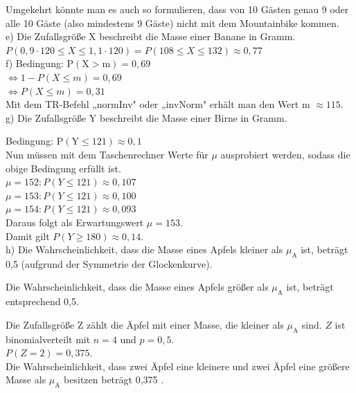 \documentclass[10pt]{article}
\begin{document}
Umgekehrt könnte man es auch so formulieren, dass von 10 Gästen genau 9 oder alle 10 Gäste (also mindestens 9 Gäste) nicht mit dem Mountainbike kommen.\\
e) Die Zufallsgröße X beschreibt die Masse einer Banane in Gramm.\\
$P(0,9 \cdot 120 \leq X \leq 1,1 \cdot 120)=P(108 \leq X \leq 132) \approx 0,77$\\
f) Bedingung: $\mathrm{P}(\mathrm{X}>\mathrm{m})=0,69$\\
$\Leftrightarrow 1-P(X \leq m)=0,69$\\
$\Leftrightarrow P(X \leq m)=0,31$\\
Mit dem TR-Befehl „normInv" oder „invNorm" erhält man den Wert m $\approx 115$.\\
g) Die Zufallsgröße Y beschreibt die Masse einer Birne in Gramm.

Bedingung: $\mathrm{P}(\mathrm{Y} \leq 121) \approx 0,1$\\
Nun müssen mit dem Taschenrechner Werte für $\mu$ ausprobiert werden, sodass die obige Bedingung erfüllt ist.\\
$\mu=152: P(Y \leq 121) \approx 0,107$\\
$\mu=153: P(Y \leq 121) \approx 0,100$\\
$\mu=154: P(Y \leq 121) \approx 0,093$\\
Daraus folgt als Erwartungswert $\mu=153$.\\
Damit gilt $P(Y \geq 180) \approx 0,14$.\\
h) Die Wahrscheinlichkeit, dass die Masse eines Apfels kleiner als $\mu_{\mathrm{A}}$ ist, beträgt 0,5 (aufgrund der Symmetrie der Glockenkurve).

Die Wahrscheinlichkeit, dass die Masse eines Apfels größer als $\mu_{\mathrm{A}}$ ist, beträgt entsprechend 0,5.

Die Zufallsgröße Z zählt die Äpfel mit einer Masse, die kleiner als $\mu_{\mathrm{A}}$ sind. $Z$ ist binomialverteilt mit $n=4$ und $p=0,5$.\\
$P(Z=2)=0,375$.\\
Die Wahrscheinlichkeit, dass zwei Äpfel eine kleinere und zwei Äpfel eine größere Masse als $\mu_{\mathrm{A}}$ besitzen beträgt 0,375 .
\end{document}
